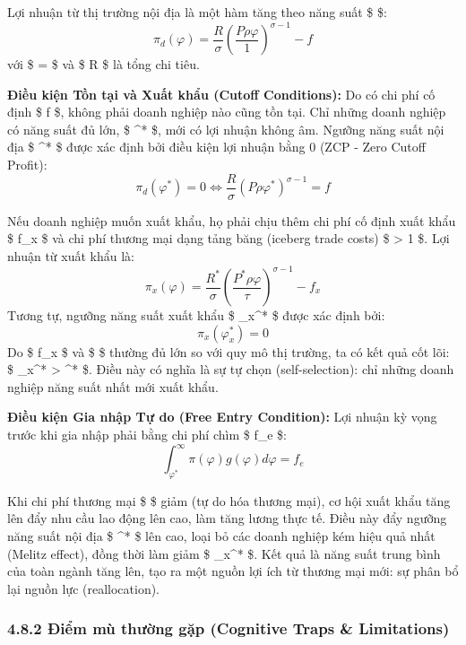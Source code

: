 \documentclass[
]{article}
\begin{document}
Lợi nhuận từ thị trường nội địa là một hàm tăng theo năng suất \$
\varphi \$:
\[ \pi_d(\varphi) = \frac{R}{\sigma} \left( \frac{P \rho \varphi}{1} \right)^{\sigma-1} - f \]
với \$ \rho =  \$ và \$ R \$ là tổng chi tiêu.

\textbf{Điều kiện Tồn tại và Xuất khẩu (Cutoff Conditions):} Do có chi
phí cố định \$ f \$, không phải doanh nghiệp nào cũng tồn tại. Chỉ những
doanh nghiệp có năng suất đủ lớn, \$ \varphi \geq \varphi\^{}* \$, mới
có lợi nhuận không âm. Ngưỡng năng suất nội địa \$ \varphi\^{}* \$ được
xác định bởi điều kiện lợi nhuận bằng 0 (ZCP - Zero Cutoff Profit):
\[ \pi_d(\varphi^*) = 0 \iff \frac{R}{\sigma} (P \rho \varphi^*)^{\sigma-1} = f \]

Nếu doanh nghiệp muốn xuất khẩu, họ phải chịu thêm chi phí cố định xuất
khẩu \$ f\_x \$ và chi phí thương mại dạng tảng băng (iceberg trade
costs) \$ \tau \textgreater{} 1 \$. Lợi nhuận từ xuất khẩu là:
\[ \pi_x(\varphi) = \frac{R^*}{\sigma} \left( \frac{P^* \rho \varphi}{\tau} \right)^{\sigma-1} - f_x \]
Tương tự, ngưỡng năng suất xuất khẩu \$ \varphi\_x\^{}* \$ được xác định
bởi: \[ \pi_x(\varphi_x^*) = 0 \] Do \$ f\_x \$ và \$ \tau \$ thường đủ
lớn so với quy mô thị trường, ta có kết quả cốt lõi: \$ \varphi\_x\^{}*
\textgreater{} \varphi\^{}* \$. Điều này có nghĩa là sự tự chọn
(self-selection): chỉ những doanh nghiệp năng suất nhất mới xuất khẩu.

\textbf{Điều kiện Gia nhập Tự do (Free Entry Condition):} Lợi nhuận kỳ
vọng trước khi gia nhập phải bằng chi phí chìm \$ f\_e \$:
\[ \int_{\varphi^*}^\infty \pi(\varphi) g(\varphi) d\varphi = f_e \]

Khi chi phí thương mại \$ \tau \$ giảm (tự do hóa thương mại), cơ hội
xuất khẩu tăng lên đẩy nhu cầu lao động lên cao, làm tăng lương thực tế.
Điều này đẩy ngưỡng năng suất nội địa \$ \varphi\^{}* \$ lên cao, loại
bỏ các doanh nghiệp kém hiệu quả nhất (Melitz effect), đồng thời làm
giảm \$ \varphi\_x\^{}* \$. Kết quả là năng suất trung bình của toàn
ngành tăng lên, tạo ra một nguồn lợi ích từ thương mại mới: sự phân bổ
lại nguồn lực (reallocation).

\subsubsection{4.8.2 Điểm mù thường gặp (Cognitive Traps \&
Limitations)}\label{ux111iux1ec3m-muxf9-thux1b0ux1eddng-gux1eb7p-cognitive-traps-limitations}
\end{document}

